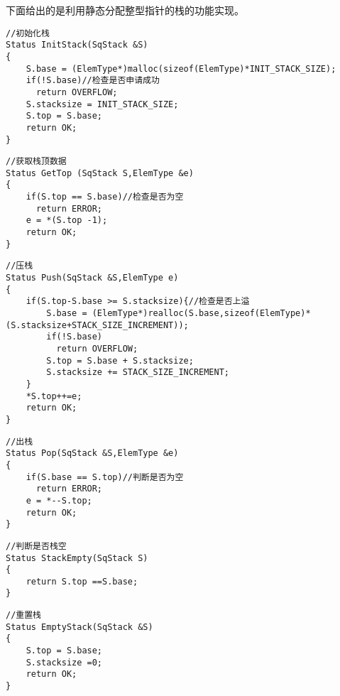 \documentclass[a4paper,11pt]{article}%
\begin{document}
下面给出的是利用静态分配整型指针的栈的功能实现。
\begin{lstlisting}[language={[ANSI]C},keywordstyle=\color{blue!70},commentstyle=\color{red!50!green!50!blue!50},frame=shadowbox,
				rulesepcolor=\color{red!20!green!20!blue!20}]
//初始化栈
Status InitStack(SqStack &S)
{
	S.base = (ElemType*)malloc(sizeof(ElemType)*INIT_STACK_SIZE);
	if(!S.base)//检查是否申请成功
	  return OVERFLOW;
	S.stacksize = INIT_STACK_SIZE;
	S.top = S.base;
	return OK;
}
\end{lstlisting}
\begin{lstlisting}[language={[ANSI]C},keywordstyle=\color{blue!70},commentstyle=\color{red!50!green!50!blue!50},frame=shadowbox,
				rulesepcolor=\color{red!20!green!20!blue!20}]
//获取栈顶数据
Status GetTop (SqStack S,ElemType &e)
{
	if(S.top == S.base)//检查是否为空
	  return ERROR;
	e = *(S.top -1);
	return OK;
}
\end{lstlisting}
\begin{lstlisting}[language={[ANSI]C},keywordstyle=\color{blue!70},commentstyle=\color{red!50!green!50!blue!50},frame=shadowbox,
				rulesepcolor=\color{red!20!green!20!blue!20}]
//压栈
Status Push(SqStack &S,ElemType e)
{
	if(S.top-S.base >= S.stacksize){//检查是否上溢
		S.base = (ElemType*)realloc(S.base,sizeof(ElemType)*(S.stacksize+STACK_SIZE_INCREMENT));
		if(!S.base)
		  return OVERFLOW;
		S.top = S.base + S.stacksize;
		S.stacksize += STACK_SIZE_INCREMENT;
	}
	*S.top++=e;
	return OK;
}
\end{lstlisting}
\begin{lstlisting}[language={[ANSI]C},keywordstyle=\color{blue!70},commentstyle=\color{red!50!green!50!blue!50},frame=shadowbox,
				rulesepcolor=\color{red!20!green!20!blue!20}]
//出栈
Status Pop(SqStack &S,ElemType &e)
{
	if(S.base == S.top)//判断是否为空
	  return ERROR;
	e = *--S.top;
	return OK;
}
\end{lstlisting}
\begin{lstlisting}[language={[ANSI]C},keywordstyle=\color{blue!70},commentstyle=\color{red!50!green!50!blue!50},frame=shadowbox,
				rulesepcolor=\color{red!20!green!20!blue!20}]
//判断是否栈空
Status StackEmpty(SqStack S)
{
	return S.top ==S.base;
}
\end{lstlisting}
\begin{lstlisting}[language={[ANSI]C},keywordstyle=\color{blue!70},commentstyle=\color{red!50!green!50!blue!50},frame=shadowbox,
				rulesepcolor=\color{red!20!green!20!blue!20}]
//重置栈
Status EmptyStack(SqStack &S)
{
	S.top = S.base;
	S.stacksize =0;
	return OK;
}
\end{lstlisting}
\end{document}

